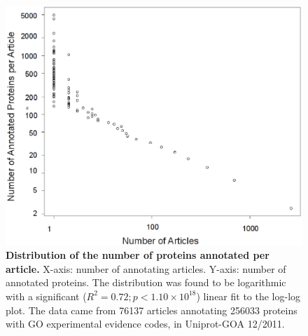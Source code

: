\documentclass[12pt]{article}
\begin{document}
\begin{figure}[!ht]
\begin{center}
\includegraphics[width=6in]{articles-prots.eps}
\end{center}
\caption{
{\bf Distribution of the number of proteins annotated per article.} X-axis: number of annotating
articles. Y-axis: number of annotated proteins. The distribution was found to be logarithmic with a
significant ($R^2=0.72; p<1.10\times 10^{18}$) linear fit to the log-log plot. The data came from 76137
articles annotating 256033 proteins with GO experimental evidence codes, in Uniprot-GOA 12/2011.
}
\label{fig:articles-prots}
\end{figure}
\newpage
\end{document}
